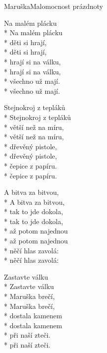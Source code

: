 \documentclass[10.5pt]{book}
\begin{document}
\begin{poem}{Maruška}{Malomocnost prázdnoty}

\settowidth{\versewidth}{Co jste to za vojsko,}

\begin{altverse}
Na malém plácku\\*
Na malém plácku\\*
děti si hrají,\\*
děti si hrají,\\*
hrají si na válku,\\*
hrají si na válku,\\*
všechno už mají.\\*
všechno už mají.
\end{altverse}

\begin{altverse}
Stejnokroj z tepláků\\*
Stejnokroj z tepláků\\*
větší než na míru,\\*
větší než na míru,\\*
dřevěný pistole,\\*
dřevěný pistole,\\*
čepice z papíru.\\*
čepice z papíru.
\end{altverse}

\begin{altverse}
A bitva za bitvou,\\*
A bitva za bitvou,\\*
tak to jde dokola,\\*
tak to jde dokola,\\*
až potom najednou\\*
až potom najednou\\*
něčí hlas zavolá:\\*
něčí hlas zavolá:
\end{altverse}

\vfill\eject

\begin{altverse}
Zastavte válku\\*
Zastavte válku\\*
Maruška brečí,\\*
Maruška brečí,\\*
dostala kamenem\\*
dostala kamenem\\*
při naší zteči.\\*
při naší zteči.
\end{altverse}


\end{poem}
\end{document}
